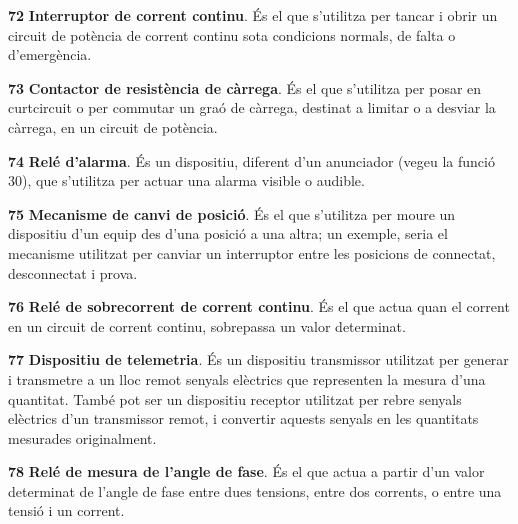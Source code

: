 \begin{multicols}{2}
\begin{list}{}
\item[\textbf{72}]   
\textbf{Interruptor de corrent
continu}. És el que s'utilitza per tancar i obrir un circuit de potència de corrent continu
 sota condicions normals, de falta o d'emergència.

\item[\textbf{73}]   
\textbf{Contactor de resistència
 de càrrega}. És el que s'utilitza per posar en curtcircuit o per commutar un graó de càrrega,
 destinat a limitar o a desviar la càrrega, en un circuit de potència.

\item[\textbf{74}]  
 \textbf{Relé d'alarma}. És un dispositiu,
diferent d'un anunciador (vegeu la funció 30), que s'utilitza per actuar una alarma
visible o audible.

\item[\textbf{75}]  
 \textbf{Mecanisme de canvi
de posició}. És el que s'utilitza per moure un dispositiu d'un equip
des d'una posició a una altra; un  exemple, seria el mecanisme
utilitzat per canviar un interruptor entre les posicions de
connectat, desconnectat i prova.

\item[\textbf{76}]   
\textbf{Relé de
sobrecorrent de corrent continu}. És el que actua quan el corrent en un circuit de
corrent continu, sobrepassa un valor determinat.

\item[\textbf{77}]   
\textbf{Dispositiu de telemetria}. És un
 dispositiu transmissor utilitzat per generar i transmetre  a un lloc remot senyals elèctrics que representen la mesura d'una quantitat. També pot ser un dispositiu receptor utilitzat per rebre senyals elèctrics d'un transmissor remot, i convertir aquests senyals en les quantitats mesurades originalment.

\item[\textbf{78}]   
\textbf{Relé de  mesura de l'angle de fase}. És el que actua a partir d'un valor determinat de
l'angle de fase entre dues tensions, entre dos corrents, o entre una
tensió i un corrent.


\end{list}
\end{multicols}
